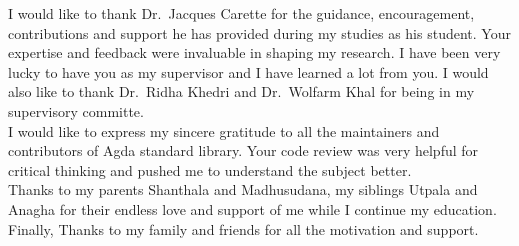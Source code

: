 
I would like to thank Dr.\  Jacques Carette for the guidance, encouragement,
contributions and support he has provided during my studies as his student. Your
expertise and feedback were invaluable in shaping my research. I have been very
lucky to have you as my supervisor and I have learned a lot from you. I would
also like to thank Dr.\  Ridha Khedri and Dr.\ Wolfarm Khal for being in my
supervisory committe.\\

I would like to express my sincere gratitude to all the maintainers and
contributors of Agda standard library. Your code review was very helpful for
critical thinking and pushed me to understand the subject better. \\

Thanks to my parents Shanthala and Madhusudana, my siblings Utpala and Anagha
for their endless love and support of me while I continue my education. Finally,
Thanks to my family and friends for all the motivation and support.